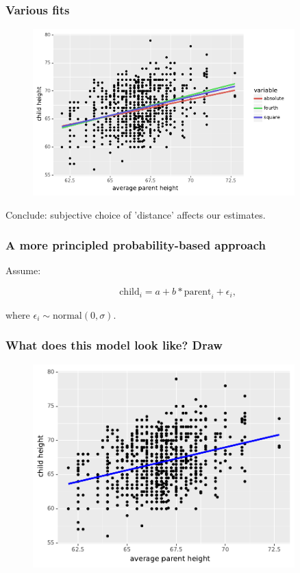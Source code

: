 \documentclass[handout]{beamer}
\begin{document}
\begin{frame}
	\frametitle{Various fits}
	
		\begin{figure}[ht]
			\centerline{\includegraphics[width=0.9\textwidth]{../figures/galton_fits_all.pdf}}
		\end{figure}
		
		Conclude: subjective choice of 'distance' affects our estimates.
	
\end{frame}

\begin{frame}
	\frametitle{A more principled probability-based approach}
	
	Assume:
	
	\begin{equation}
	\text{child}_i = a + b * \text{parent}_i + \epsilon_i,
	\end{equation}
	
	where $\epsilon_i \sim \text{normal}(0, \sigma)$.
	
\end{frame}

\begin{frame}
	\frametitle{What does this model look like? Draw}
	
	\begin{figure}[ht]
		\centerline{\includegraphics[width=0.9\textwidth]{../figures/galton_fit_sse.pdf}}
	\end{figure}
	
\end{frame}
\end{document}
